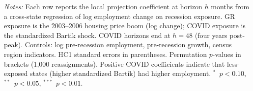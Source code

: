 \begin{table}[H]
\begin{threeparttable}
\begin{tablenotes}[flushleft]
\small
\item \textit{Notes:} Each row reports the local projection coefficient at horizon $h$ months from a cross-state regression of log employment change on recession exposure. GR exposure is the 2003--2006 housing price boom (log change); COVID exposure is the standardized Bartik shock. COVID horizons end at $h=48$ (four years post-peak). Controls: log pre-recession employment, pre-recession growth, census region indicators. HC1 standard errors in parentheses. Permutation $p$-values in brackets (1,000 reassignments). Positive COVID coefficients indicate that less-exposed states (higher standardized Bartik) had higher employment. $^{*}$~$p<0.10$, $^{**}$~$p<0.05$, $^{***}$~$p<0.01$.
\end{tablenotes}
\end{threeparttable}
\label{tab:dynamic}
\end{table}
